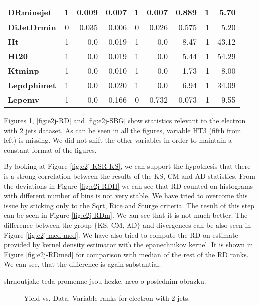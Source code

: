 \begin{table}[htbp]
\begin{center}
\begin{tabular}{|l|r|r|r|r|r|r|r|r|}
\textbf{DRminejet} & 1 & 0.009 & 0.007 & 1 & 0.007 & 0.889 & 1 & 5.70 \\ \hline
\textbf{DiJetDrmin} & 0 & 0.035 & 0.006 & 0 & 0.026 & 0.575 & 1 & 5.20 \\ \hline
\textbf{Ht} & 1 & 0.0 & 0.019 & 1 & 0.0 & 8.47 & 1 & 43.12 \\ \hline
\textbf{Ht20} & 1 & 0.0 & 0.019 & 1 & 0.0 & 5.44 & 1 & 54.29 \\ \hline
\textbf{Ktminp} & 1 & 0.0 & 0.010 & 1 & 0.0 & 1.73 & 1 & 8.00 \\ \hline
\textbf{Lepdphimet} & 1 & 0.0 & 0.020 & 1 & 0.0 & 6.94 & 1 & 34.09 \\ \hline
\textbf{Lepemv} & 1 & 0.0 & 0.166 & 0 & 0.732 & 0.073 & 1 & 9.55 \\ \hline
\end{tabular}
\end{center}
\label{tab:e2j-tests}
\end{table}

Figures \ref{fig:e2j-KSR}, \ref{fig:e2j-RD} and \ref{fig:e2j-SBG} show statistics relevant to the electron with 2 jets dataset. As can be seen in all the figures, variable HT3 (fifth from left) is missing. We did not shift the other variables in order to maintain a constant format of the figures. 

By looking at Figure \ref{fig:e2j-KSR-KS}, we can support the hypothesis that there is a strong correlation between the results of the KS, CM and AD statistics. From the deviations in Figure \ref{fig:e2j-RDH} we can see that RD counted on histograms with different number of bins is not very stable. We have tried to overcome this issue by sticking only to the \textsf{Sqrt, Rice} and \textsf{Sturge} criteria. The result of this  
step can be seen in Figure \ref{fig:e2j-RDm}. We can see that it is not much better. The difference between the group $\lbrace$KS, CM, AD$\rbrace$ and \ren divergences can be also seen in Figure \ref{fig:e2j-med-med}. We have also tried to compute the RD on estimate provided by kernel density estimator with the epanechnikov kernel. It is shown in Figure \ref{fig:e2j-RDmed} for comparison with median of the rest of the RD ranks. We can see, that the difference is again substantial. 

shrnoutjake teda promenne jsou hezke.  neco o poslednim obrazku.


\begin{figure}[htb]
    \centering
	\quad
    \caption{Yield vs. Data. Variable ranks for electron with 2 jets.}
     \label{fig:e2j-KSR}
\end{figure}	

